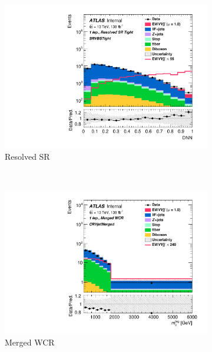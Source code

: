\begin{figure}[ht]
\begin{subfigure}[b]{0.32\textwidth}
        \includegraphics[width=\textwidth]{figures/FitResults/prefit/Region_distDNN_DSRVBSTight_BMin0_T0_Y6051_incTag1_J2_L1_incJet1_Prefitlog.pdf}
        \caption{Resolved SR}
    \end{subfigure}
    \\
    \begin{subfigure}[b]{0.32\textwidth}
        \includegraphics[width=\textwidth]{figures/FitResults/prefit/Region_disttagMjj_DCRVjetMerged_BMin0_J0_incJet1_L1_T0_incFat1_Y6051_incTag1_Fat1_Prefitlog.pdf}
        \caption{Merged WCR}
    \end{subfigure}
    \begin{subfigure}[b]{0.32\textwidth}

\end{subfigure}
\end{figure}
